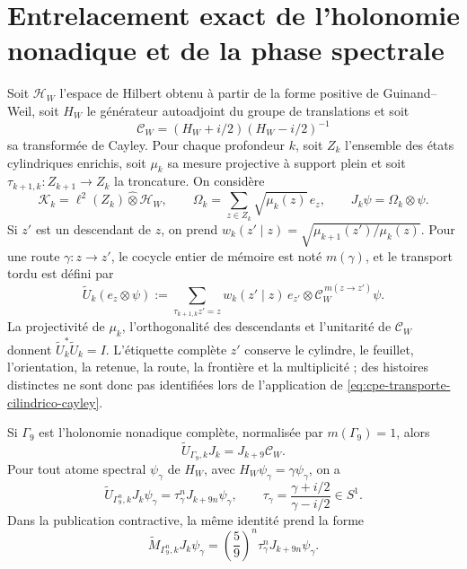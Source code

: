 
\section{Entrelacement exact de l'holonomie nonadique et de la phase spectrale}
\label{sec:cpe-entrelazamiento-exacto}

Soit \(\mathcal H_W\) l'espace de Hilbert obtenu à partir de la forme positive de
Guinand--Weil, soit \(H_W\) le générateur autoadjoint du groupe de
translations et soit
\[
 \mathcal C_W=(H_W+i/2)(H_W-i/2)^{-1}
\]
sa transformée de Cayley. Pour chaque profondeur \(k\), soit \(Z_k\)
l'ensemble des états cylindriques enrichis, soit \(\mu_k\) sa mesure
projective à support plein et soit
\(\tau_{k+1,k}:Z_{k+1}\to Z_k\) la troncature. On considère
\[
 \mathscr K_k=\ell^2(Z_k)\widehat\otimes\mathcal H_W,
 \qquad
 \Omega_k=\sum_{z\in Z_k}\sqrt{\mu_k(z)}\,e_z,
 \qquad
 J_k\psi=\Omega_k\otimes\psi.
\]
Si \(z'\) est un descendant de \(z\), on prend
\(w_k(z'\mid z)=\sqrt{\mu_{k+1}(z')/\mu_k(z)}\). Pour une route
\(\gamma:z\to z'\), le cocycle entier de mémoire est noté
\(m(\gamma)\), et le transport tordu est défini par
\begin{equation}
 \widetilde U_k(e_z\otimes\psi)
 :=\sum_{\tau_{k+1,k}z'=z}
 w_k(z'\mid z)\,e_{z'}\otimes
 \mathcal C_W^{\,m(z\to z')}\psi.
 \label{eq:cpe-transporte-cilindrico-cayley}
\end{equation}
La projectivité de \(\mu_k\), l'orthogonalité des descendants et
l'unitarité de \(\mathcal C_W\) donnent
\(\widetilde U_k^*\widetilde U_k=I\). L'étiquette complète \(z'\)
conserve le cylindre, le feuillet, l'orientation, la retenue, la route, la frontière et la
multiplicité ; des histoires distinctes ne sont donc pas identifiées lors de l'application de
\eqref{eq:cpe-transporte-cilindrico-cayley}.

\begin{theorem}
\label{thm:cpe-entrelazamiento-cayley-tpk}
Si \(\Gamma_9\) est l'holonomie nonadique complète, normalisée par
\(m(\Gamma_9)=1\), alors
\begin{equation}
 \boxed{\widetilde U_{\Gamma_9,k}J_k
 =J_{k+9}\mathcal C_W.}
 \label{eq:cpe-entrelazamiento-exacto}
\end{equation}
Pour tout atome spectral \(\psi_\gamma\) de \(H_W\), avec
\(H_W\psi_\gamma=\gamma\psi_\gamma\), on a
\begin{equation}
 \widetilde U_{\Gamma_9^n,k}J_k\psi_\gamma
 =\tau_\gamma^nJ_{k+9n}\psi_\gamma,
 \qquad
 \tau_\gamma=\frac{\gamma+i/2}{\gamma-i/2}\in S^1.
 \label{eq:cpe-orbita-espectral-ledger}
\end{equation}
Dans la publication contractive, la même identité prend la forme
\[
 \widetilde M_{\Gamma_9^n,k}J_k\psi_\gamma
 =\left(\frac59\right)^n\tau_\gamma^n
 J_{k+9n}\psi_\gamma.
\]
\end{theorem}

